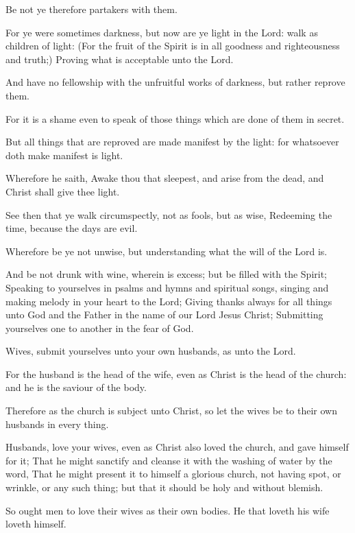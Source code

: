\verse Be not ye therefore partakers with them.

\verse For ye were sometimes darkness, but now are ye light in the Lord: walk as children of light: \verse (For the fruit of the Spirit is in all goodness and righteousness and truth;) \verse Proving what is acceptable unto the Lord.

\verse And have no fellowship with the unfruitful works of darkness, but rather reprove them.

\verse For it is a shame even to speak of those things which are done of them in secret.

\verse But all things that are reproved are made manifest by the light: for whatsoever doth make manifest is light.

\verse Wherefore he saith, Awake thou that sleepest, and arise from the dead, and Christ shall give thee light.

\verse See then that ye walk circumspectly, not as fools, but as wise, \verse Redeeming the time, because the days are evil.

\verse Wherefore be ye not unwise, but understanding what the will of the Lord is.

\verse And be not drunk with wine, wherein is excess; but be filled with the Spirit; \verse Speaking to yourselves in psalms and hymns and spiritual songs, singing and making melody in your heart to the Lord; \verse Giving thanks always for all things unto God and the Father in the name of our Lord Jesus Christ; \verse Submitting yourselves one to another in the fear of God.

\verse Wives, submit yourselves unto your own husbands, as unto the Lord.

\verse For the husband is the head of the wife, even as Christ is the head of the church: and he is the saviour of the body.

\verse Therefore as the church is subject unto Christ, so let the wives be to their own husbands in every thing.

\verse Husbands, love your wives, even as Christ also loved the church, and gave himself for it; \verse That he might sanctify and cleanse it with the washing of water by the word, \verse That he might present it to himself a glorious church, not having spot, or wrinkle, or any such thing; but that it should be holy and without blemish.

\verse So ought men to love their wives as their own bodies. He that loveth his wife loveth himself.

